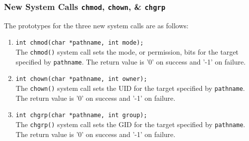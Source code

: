 \documentclass[11pt,letterpaper]{report}
\begin{document}
	\subsubsection{New System Calls {\tt chmod}, {\tt chown},  \& {\tt chgrp}}
	The prototypes for the three new system calls are as follows:
	\begin{enumerate}
		\item {\tt int chmod(char *pathname, int mode);}\\
		The {\tt chmod()} system call sets the mode, or permission, bits for the target specified by {\tt pathname}. The return value is '0' on success and '-1' on failure.
		
		\item {\tt int chown(char *pathname, int owner);}\\
		The {\tt chown()} system call sets the UID for the target specified by {\tt pathname}. The return value is '0' on success and '-1' on failure.
		
		\item {\tt int chgrp(char *pathname, int group);}\\
		The {\tt chgrp()} system call sets the GID for the target specified by {\tt pathname}. The return value is '0' on success and '-1' on failure.
	\end{enumerate}
	
\end{document}
